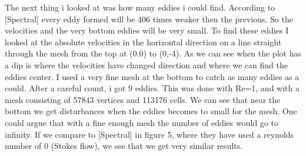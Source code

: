 \documentclass[a4paper,norsk]{article}
\begin{document}
The next thing i looked at was how many eddies i could find. According to [Spectral] every eddy formed will be 406 times weaker then the previous. So the velocities and the very bottom eddies will be very small. To find these eddies I looked at the absolute velocities in the horizontal direction on a line straight through the mesh from the top at (0.0) to (0,-4). As we can see when the plot has a dip is where the velocities have changed direction and where we can find the eddies center. I used a very fine mesh at the bottom to catch as many eddies as a could. After a careful count, i got 9 eddies. This was done with Re=1, and with a mesh consisting of 57843 vertices and 113176 cells.\newline
We can see that near the bottom we get disturbances when the eddies becomes to small for the mesh. One could argue that with a fine enough mesh the number of eddies would go to infinity.
\newline
If we compare to [Spectral] in figure 5, where they have used a reynolds number of 0 (Stokes flow), we see that we get very similar results.
\end{document}
